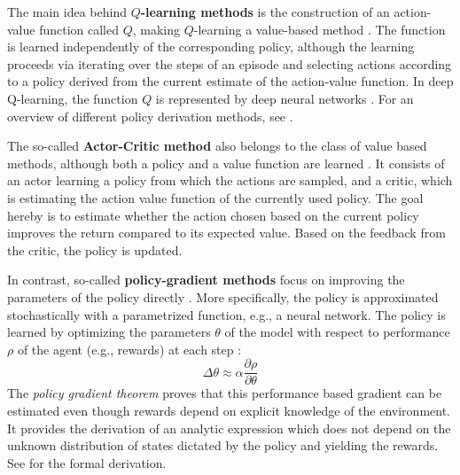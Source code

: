 The main idea behind \textbf{$Q$-learning methods} is the construction of an action-value function called $Q$, making $Q$-learning a value-based method \parencite{sutton2018reinforcement}. The function is learned independently of the corresponding policy, although the learning proceeds via iterating over the steps of an episode and selecting actions according to a policy derived from the current estimate of the action-value function. In deep Q-learning, the function $Q$ is represented by deep neural networks \parencite[e.g.,][]{hester2018deep}. For an overview of different policy derivation methods, see \cite{sutton2018reinforcement}. 

The so-called \textbf{Actor-Critic method} also belongs to the class of value based methods, although both a policy and a value function are learned \parencite{sutton2018reinforcement}. It consists of an actor learning a policy from which the actions are sampled, and a critic, which is estimating the action value function of the currently used policy. The goal hereby is to estimate whether the action chosen based on the current policy improves the return compared to its expected value. Based on the feedback from the critic, the policy is updated. 

In contrast, so-called \textbf{policy-gradient methods} focus on improving the parameters of the policy directly \parencite{sutton2018reinforcement, sutton1999policy, williams1992simple}. %
More specifically, the policy is approximated stochastically with a parametrized function, e.g., a neural network. The policy is learned by optimizing the parameters $\theta$ of the model with respect to performance $\rho$ of the agent (e.g., rewards) at each step \parencite[][p. 1058]{sutton1999policy}: 
\begin{equation}
\Delta \theta \approx \alpha \frac{\partial \rho}{\partial \theta} 
\end{equation}
The \textit{policy gradient theorem} proves that this performance based gradient can be estimated even though rewards depend on explicit knowledge of the environment. It provides the derivation of an analytic expression which does not depend on the unknown distribution of states dictated by the policy and yielding the rewards. See \cite[][p. 326f.,]{sutton2018reinforcement} for the formal derivation.

